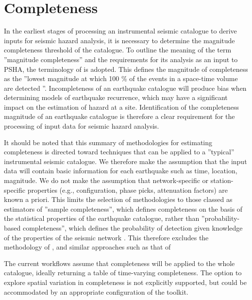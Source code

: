 
\section{Completeness}

In the earliest stages of processing an instrumental seismic catalogue to derive inputs for seismic hazard analysis, it is necessary to determine the magnitude completeness threshold of the catalogue. To outline the meaning of the term ''magnitude completeness'' and the requirements for its analysis as an input to PSHA, the terminology of \textcite{MignanWoessner2012} is adopted. This defines the magnitude of completeness as the ''lowest magnitude at which 100 \% of the events in a space-time volume are detected \parencite{RydelekSacks1989, WoessnerWiemer2005}''. Incompleteness of an earthquake catalogue will produce bias when determining models of earthquake recurrence, which may have a significant impact on the estimation of hazard at a site. Identification of the completeness magnitude of an earthquake catalogue is therefore a clear requirement for the processing of input data for seismic hazard analysis.

It should be noted that this summary of methodologies for estimating completeness is directed toward techniques that can be applied to a ''typical'' instrumental seismic catalogue. We therefore make the assumption that the input data will contain basic information for each earthquake such as time, location, magnitude. We do not make the assumption that network-specific or station-specific properties (e.g., configuration, phase picks, attenuation factors) are known a priori. This limits the selection of methodologies to those classed as estimators of ''sample completeness'', which defines completeness on the basis of the statistical properties of the earthquake catalogue, rather than ''probability-based completeness'', which defines the probability of detection given knowledge of the properties of the seismic network \parencite{SchorlemmerWoessner2008}. This therefore excludes the methodology of \textcite{SchorlemmerWoessner2008}, and similar approaches such as that of \textcite{Felzer2008}

The current workflows assume that completeness will be applied to the whole catalogue, ideally returning a table of time-varying completeness. The option to explore spatial variation in completeness is not explicitly supported, but could be accommodated by an appropriate configuration of the toolkit.

